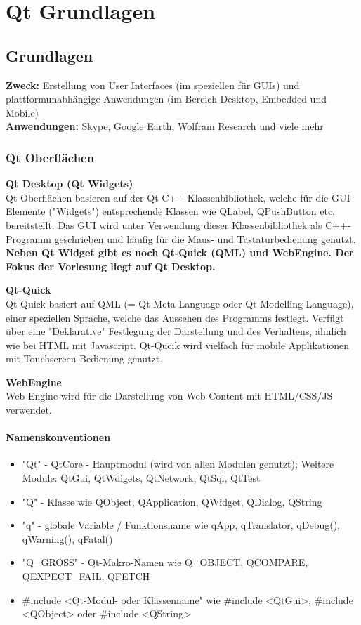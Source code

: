 \chapter{Qt Grundlagen}

\section{Grundlagen}
\textbf{Zweck:} Erstellung von User Interfaces (im speziellen für GUIs) und plattformunabhängige Anwendungen (im Bereich Desktop, Embedded und Mobile) \\
\textbf{Anwendungen:} Skype, Google Earth, Wolfram Research und viele mehr

\subsection{Qt Oberflächen}
\textbf{Qt Desktop (Qt Widgets)} \\
Qt Oberflächen basieren auf der Qt C++ Klassenbibliothek, welche für die GUI-Elemente ("Widgets") entsprechende Klassen wie QLabel, QPushButton etc. bereitstellt. Das GUI wird unter Verwendung dieser Klassenbibliothek als C++-Programm geschrieben und häufig für die Maus- und Tastaturbedienung genutzt. 
\textbf{Neben Qt Widget gibt es noch Qt-Quick (QML) und WebEngine. Der Fokus der Vorlesung liegt auf Qt Desktop.}

\textbf{Qt-Quick} \\
Qt-Quick basiert auf QML (= Qt Meta Language oder Qt Modelling Language), einer speziellen Sprache, welche das Aussehen des Programms festlegt. Verfügt über eine "Deklarative" Festlegung der Darstellung und des Verhaltens, ähnlich wie bei HTML mit Javascript. Qt-Qucik wird vielfach für mobile Applikationen mit Touchscreen Bedienung genutzt.

\textbf{WebEngine} \\
Web Engine wird für die Darstellung von Web Content mit HTML/CSS/JS verwendet. 

\subsubsection{Namenskonventionen}
\begin{itemize}
	\item "Qt" - QtCore - Hauptmodul (wird von allen Modulen genutzt); Weitere Module: QtGui, QtWdigets, QtNetwork, QtSql, QtTest
	\item "Q" - Klasse wie QObject, QApplication, QWidget, QDialog, QString
	\item "q" - globale Variable / Funktionsname wie qApp, qTranslator, qDebug(), qWarning(), qFatal()
	\item "Q\_GROSS" - Qt-Makro-Namen wie Q\_OBJECT, QCOMPARE, QEXPECT\_FAIL, QFETCH
	\item \#include <Qt-Modul- oder Klassenname" wie \#include <QtGui>, \#include <QObject> oder \#include <QString>
\end{itemize}

